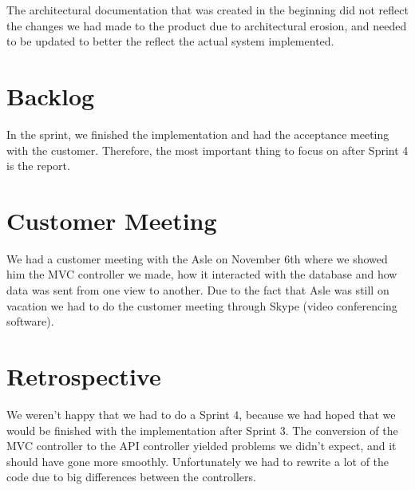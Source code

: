 The architectural documentation that was created in the beginning did not reflect the changes we had made to the product due to architectural erosion, and needed to be updated to better the reflect the actual system implemented.

\section{Backlog}
In the sprint, we finished the implementation and had the acceptance meeting with the customer. Therefore, the most important thing to focus on after Sprint 4 is the report.

\section{Customer Meeting}
We had a customer meeting with the Asle on November 6th where we showed him the MVC controller we made, how it interacted with the database and how data was sent from one view to another. Due to the fact that Asle was still on vacation we had to do the customer meeting through Skype (video conferencing software).

\section{Retrospective}
We weren't happy that we had to do a Sprint 4, because we had hoped that we would be finished with the implementation after Sprint 3. The conversion of the MVC controller to the API controller yielded problems we didn't expect, and it should have gone more smoothly. Unfortunately we had to rewrite a lot of the code due to big differences between the controllers.

